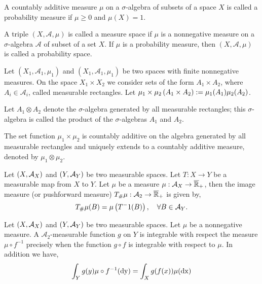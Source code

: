 \begin{definition}[Probability]
	A countably additive measure $\mu$ on a $\sigma$-algebra of subsets of a space $X$ is called a probability measure if $\mu \geq 0$ and $\mu(X)= 1$.
	
	A triple $(X, \mathcal A, \mu )$ is called a measure space if $\mu$ is a
	nonnegative measure on a $\sigma$-algebra $\mathcal A$ of subset of a set $X$. If $\mu$ is a probability measure, then $(X, \mathcal A, \mu)$ is called a probability space.
\end{definition}

\begin{definition}
Let $\left(X_1 , \mathcal{A}_1 , \mu_1 \right)$ and $\left(X_1 , \mathcal{A}_1 , \mu_1 \right)$ be two spaces with finite nonnegative measures. On the space $X_1\times X_2$ we consider sets of the form $A_1\times A_2$, where $A_i \in \mathcal{A}_i$, called measurable rectangles. Let $\mu_1\times \mu_2 \left( A_1\times A_2 \right):= \mu_1(A_1)\mu_2(A_2)$. 

Let $A_1\otimes A_2$ denote the $\sigma$-algebra generated by all measurable rectangles; this $\sigma$-algebra is called the product of the $\sigma$-algebras $A_1$ and $A_2$.  

\end{definition}

\begin{theorem}
The set function $\mu_1\times \mu_2$ is countably additive on the algebra generated by all measurable rectangles and uniquely extends to a countably additive measure, denoted by $\mu_1\otimes \mu_2$.
\end{theorem}

\begin{definition}
	Let $\left( X, \mathcal{A}_X \right)$  and $\left( Y, \mathcal{A}_Y \right)$ be two measurable spaces. Let $T:X\rightarrow Y$ be a measurable map from $X$ to $Y$. Let $\mu$ be a measure $\mu: \mathcal{A}_X\rightarrow \overline{\mathbb{R}}_+$, then the image measure (or pushforward measure) ${T}_{\#} \mu:\mathcal{A}_2\rightarrow \overline{\mathbb{R}}_+$ is given by,
	\begin{equation*}
		{T}_{\#} \mu(B) = \mu\left( T^-1(B) \right), \quad \forall B \in \mathcal{A}_Y.
	\end{equation*}
\end{definition}


\begin{theorem}
	Let $\left( X, \mathcal{A}_X \right)$  and $\left( Y, \mathcal{A}_Y \right)$ be two measurable spaces. Let $\mu$ be a nonnegative measure. A $\mathcal{A}_2$-measurable function $g$ on $Y$ is integrable with respect the measure $\mu\circ f^{-1}$ precisely when the function $g\circ f$ is integrable with respect to $\mu$. In addition we have, 
	\begin{equation*}
		\int_Y g(y)\mu\circ f^{-1}(\mathrm{dy}) = \int_X g(f(x))\mu(\mathrm{dx})
	\end{equation*}
\end{theorem}

